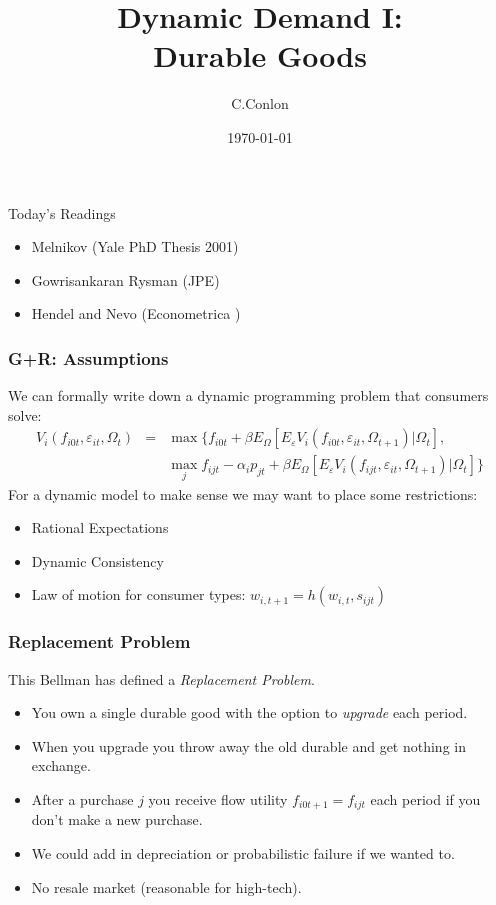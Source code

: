 \documentclass[xcolor=pdftex,dvipsnames,table,mathserif,aspectratio=169]{beamer}
\title [Dynamic Demand I]{Dynamic Demand I:\\
 Durable Goods }
\author{C.Conlon}
\institute{Grad IO}
\date{\today}
\begin{document}
\begin{frame}
\titlepage
\end{frame}

\begin{frame}{Today's Readings}
\begin{itemize}
\item Melnikov (Yale PhD Thesis 2001)
\item Gowrisankaran Rysman (JPE)
\item Hendel and Nevo (Econometrica )
\end{itemize}
\end{frame}


\begin{frame}
\frametitle{G+R: Assumptions}
 We can formally write down a dynamic programming problem that consumers solve:
\begin{eqnarray*}
V_i(f_{i0t},\varepsilon_{i t}, \Omega_t) &=& \max \{ f_{i0t} + \beta E_{\Omega}[ E_{\varepsilon} V_i (f_{i0t}, \varepsilon_{it}, \Omega_{t+1}) |\Omega_{t} ] ,\\
&& \max_j f_{ijt}  -\alpha_i p_{jt} + \beta E_{\Omega}[ E_{\varepsilon} V_i (f_{ijt}, \varepsilon_{it}, \Omega_{t+1}) |\Omega_{t} ]  \}
\end{eqnarray*}
For a dynamic model to make sense we may want to place some restrictions:
\begin{itemize}
\item Rational Expectations
\item Dynamic Consistency
\item Law of motion for consumer types: $w_{i,t+1} =h(w_{i,t},s_{ijt})$ 
\end{itemize}
\end{frame}

\begin{frame}
\frametitle{Replacement Problem}
This Bellman has defined a \textit{Replacement Problem}.
\begin{itemize}
\item You own a single durable good with the option to \textit{upgrade} each period.
\item When you upgrade \alert{you throw away the old durable and get nothing in exchange}.
\item After a purchase $j$  you receive flow utility $f_{i0t+1} = f_{ijt}$ each period if you don't make a new purchase.
\item We could add in depreciation or probabilistic failure if we wanted to.
\item No resale market (reasonable for high-tech).
\end{itemize}
\end{frame}
\end{document}
